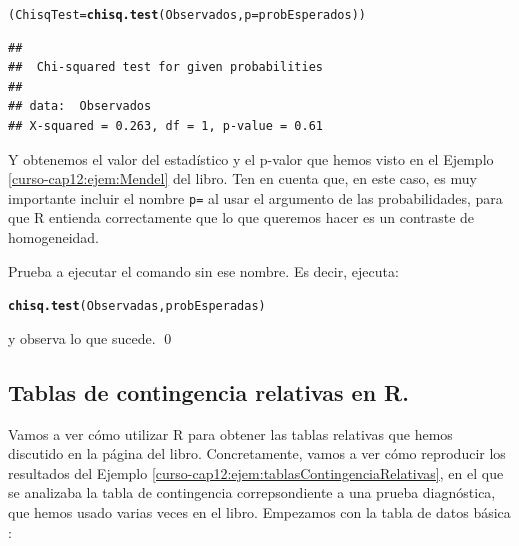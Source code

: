 \documentclass[10pt,a4paper]{article}\usepackage[]{graphicx}\usepackage[]{color}
\makeatletter
\newcommand{\hlstd}[1]{\textcolor[rgb]{0.345,0.345,0.345}{#1}}%
\newcommand{\hlkwb}[1]{\textcolor[rgb]{0.69,0.353,0.396}{#1}}%
\newcommand{\hlkwc}[1]{\textcolor[rgb]{0.333,0.667,0.333}{#1}}%
\newcommand{\hlkwd}[1]{\textcolor[rgb]{0.737,0.353,0.396}{\textbf{#1}}}%
\newenvironment{kframe}{%
 \def\at@end@of@kframe{}%
 \ifinner\ifhmode%
  \def\at@end@of@kframe{\end{minipage}}%
  \begin{minipage}{\columnwidth}%
 \fi\fi%
 \def\FrameCommand##1{\hskip\@totalleftmargin \hskip-\fboxsep
 \colorbox{shadecolor}{##1}\hskip-\fboxsep
     \hskip-\linewidth \hskip-\@totalleftmargin \hskip\columnwidth}%
 \MakeFramed {\advance\hsize-\width
   \@totalleftmargin\z@ \linewidth\hsize
   \@setminipage}}%
 {\par\unskip\endMakeFramed%
 \at@end@of@kframe}
\newenvironment{knitrout}{}{} %
\newcounter {cont01}
\makeatother
\begin{document}
\begin{knitrout}
\color{fgcolor}\begin{kframe}
\begin{alltt}
\hlstd{(ChisqTest} \hlkwb{=} \hlkwd{chisq.test}\hlstd{(Observados,} \hlkwc{p} \hlstd{= probEsperados))}
\end{alltt}
\begin{verbatim}
## 
## 	Chi-squared test for given probabilities
## 
## data:  Observados
## X-squared = 0.263, df = 1, p-value = 0.61
\end{verbatim}
\end{kframe}
\end{knitrout}

Y obtenemos el valor del estadístico y el p-valor que hemos visto en el Ejemplo \ref{curso-cap12:ejem:Mendel} del libro. Ten en cuenta que, en este caso, es muy importante incluir el nombre {\tt p=} al usar el argumento de las probabilidades, para que  R entienda correctamente que lo que queremos hacer es un contraste de homogeneidad.

\begin{ejercicio}
\label{tut12:ejercicio03}
Prueba a ejecutar el comando sin ese nombre. Es decir, ejecuta:
\begin{knitrout}
\color{fgcolor}\begin{kframe}
\begin{alltt}
\hlkwd{chisq.test}\hlstd{(Observadas, probEsperadas)}
\end{alltt}
\end{kframe}
\end{knitrout}
y observa lo que sucede.
\qed
\end{ejercicio}



\subsection{Tablas de contingencia relativas en R.}
\label{tut12:subsec:TablasContingenciaRelativasR}

Vamos a ver cómo utilizar R para obtener las tablas relativas que hemos discutido en la página \pageref{curso-cap12:subsubsec:tablasContingenciaRelativas} del libro.  Concretamente, vamos a ver cómo reproducir los resultados del Ejemplo \ref{curso-cap12:ejem:tablasContingenciaRelativas}, en el que se analizaba la tabla de contingencia correpsondiente a una prueba diagnóstica, que hemos usado varias veces en el libro. Empezamos con la tabla de datos básica :
\end{document}
